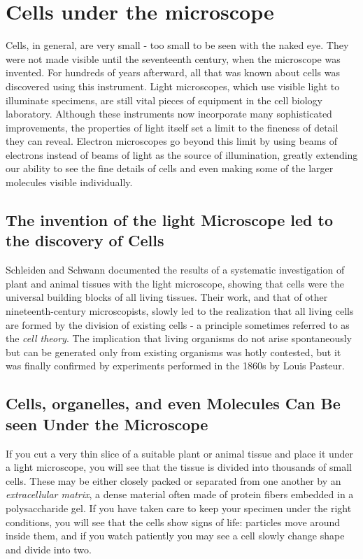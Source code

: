 \section{Cells under the microscope}

Cells, in general, are very small - too small to be seen with the naked
eye. They were not made visible until the seventeenth century, when the
microscope was invented. For hundreds of years afterward, all that was
known about cells was discovered using this instrument. Light microscopes,
which use visible light to illuminate specimens, are still vital
pieces of equipment in the cell biology laboratory.
Although these instruments now incorporate many sophisticated
improvements, the properties of light itself set a limit to the fineness of
detail they can reveal. Electron microscopes go
beyond this limit by using beams of electrons instead of beams of light
as the source of illumination, greatly extending our ability to see the fine
details of cells and even making some of the larger molecules visible
individually.

\subsection{The invention of the light Microscope led to the discovery of Cells}

Schleiden and Schwann documented the results
of a systematic investigation of plant and animal tissues with the light
microscope, showing that cells were the universal building blocks of all
living tissues. Their work, and that of other nineteenth-century microscopists,
slowly led to the realization that all living cells are formed by
the division of existing cells - a principle sometimes referred to as the
\textit{cell theory}. The implication that living organisms do not arise
spontaneously but can be generated only from existing organisms was
hotly contested, but it was finally confirmed by experiments performed in
the 1860s by Louis Pasteur.

\subsection{Cells, organelles, and even Molecules Can Be seen Under the Microscope}

If you cut a very thin slice of a suitable plant or animal tissue and place
it under a light microscope, you will see that the tissue is divided into
thousands of small cells. These may be either closely packed or separated
from one another by an \textit{extracellular matrix}, a dense material often made
of protein fibers embedded in a polysaccharide gel.
If you have taken care
to keep your specimen under the right conditions, you will see that the
cells show signs of life: particles move around inside them, and if you
watch patiently you may see a cell slowly change shape and divide into
two.

